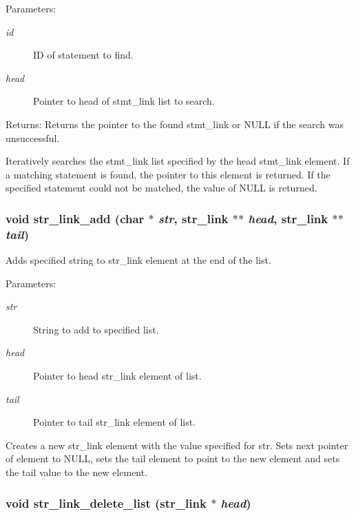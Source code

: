 \begin{Desc}
\item[Parameters:]
\begin{description}
\item[{\em id}]ID of statement to find. \item[{\em head}]Pointer to head of stmt\_\-link list to search.\end{description}
\end{Desc}
\begin{Desc}
\item[Returns:]Returns the pointer to the found stmt\_\-link or NULL if the search was unsuccessful.\end{Desc}
Iteratively searches the stmt\_\-link list specified by the head stmt\_\-link element. If a matching statement is found, the pointer to this element is returned. If the specified statement could not be matched, the value of NULL is returned. 
\subsubsection{\setlength{\rightskip}{0pt plus 5cm}void str\_\-link\_\-add (char $\ast$ {\em str}, {\bf str\_\-link} $\ast$$\ast$ {\em head}, {\bf str\_\-link} $\ast$$\ast$ {\em tail})}\label{link_8c_a0}


Adds specified string to str\_\-link element at the end of the list.

\begin{Desc}
\item[Parameters:]
\begin{description}
\item[{\em str}]String to add to specified list. \item[{\em head}]Pointer to head str\_\-link element of list. \item[{\em tail}]Pointer to tail str\_\-link element of list.\end{description}
\end{Desc}
Creates a new str\_\-link element with the value specified for str. Sets next pointer of element to NULL, sets the tail element to point to the new element and sets the tail value to the new element. 
\subsubsection{\setlength{\rightskip}{0pt plus 5cm}void str\_\-link\_\-delete\_\-list ({\bf str\_\-link} $\ast$ {\em head})}\label{link_8c_a18}


